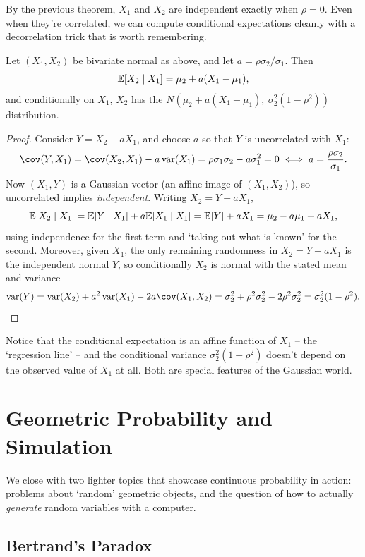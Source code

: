 \documentclass[a4paper]{scrartcl}
\begin{document}
By the previous theorem, $X_1$ and $X_2$ are independent exactly when $\rho = 0$. Even when they're correlated, we can compute conditional expectations cleanly with a decorrelation trick that is worth remembering.

\begin{proposition}
	Let $(X_1, X_2)$ be bivariate normal as above, and let $a = \rho\sigma_2/\sigma_1$. Then
	$$
	\mathbb{E}[X_2 \mid X_1] = \mu_2 + a(X_1 - \mu_1),
	$$
	and conditionally on $X_1$, $X_2$ has the $N\!\left(\mu_2 + a(X_1 - \mu_1),\ \sigma_2^2(1 - \rho^2)\right)$ distribution.
\end{proposition}
\begin{proof}
	Consider $Y = X_2 - aX_1$, and choose $a$ so that $Y$ is uncorrelated with $X_1$:
	$$
	\cov(Y, X_1) = \cov(X_2, X_1) - a\var(X_1) = \rho\sigma_1\sigma_2 - a\sigma_1^2 = 0 \iff a = \frac{\rho\sigma_2}{\sigma_1}.
	$$
	Now $(X_1, Y)$ is a Gaussian vector (an affine image of $(X_1, X_2)$), so uncorrelated implies \emph{independent}. Writing $X_2 = Y + aX_1$,
	$$
	\mathbb{E}[X_2 \mid X_1] = \mathbb{E}[Y \mid X_1] + a\mathbb{E}[X_1 \mid X_1] = \mathbb{E}[Y] + aX_1 = \mu_2 - a\mu_1 + aX_1,
	$$
	using independence for the first term and `taking out what is known' for the second. Moreover, given $X_1$, the only remaining randomness in $X_2 = Y + aX_1$ is the independent normal $Y$, so conditionally $X_2$ is normal with the stated mean and variance
	$$
	\var(Y) = \var(X_2) + a^2\var(X_1) - 2a\cov(X_1, X_2) = \sigma_2^2 + \rho^2\sigma_2^2 - 2\rho^2\sigma_2^2 = \sigma_2^2(1 - \rho^2). \qedhere
	$$
\end{proof}

Notice that the conditional expectation is an affine function of $X_1$ -- the `regression line' -- and the conditional variance $\sigma_2^2(1 - \rho^2)$ doesn't depend on the observed value of $X_1$ at all. Both are special features of the Gaussian world.


\section{Geometric Probability and Simulation}

We close with two lighter topics that showcase continuous probability in action: problems about `random' geometric objects, and the question of how to actually \emph{generate} random variables with a computer.

\subsection{Bertrand's Paradox}
\end{document}
